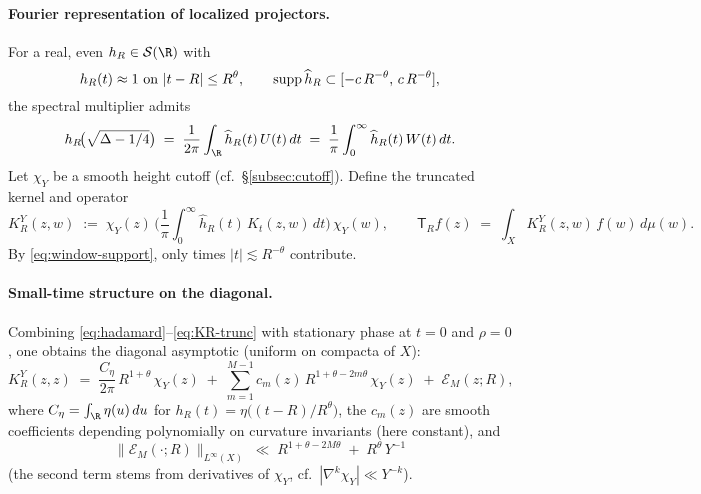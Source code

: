 \paragraph{Fourier representation of localized projectors.}
For a real, even $h_R\in \mathcal{S}(\R)$ with
\begin{equation}\label{eq:window-support}
  h_R(t)\approx 1 \ \text{on}\ |t-R|\le R^\theta, 
  \qquad \operatorname{supp} \widehat{h}_R \subset [-c\,R^{-\theta},\,c\,R^{-\theta}],
\end{equation}
the spectral multiplier admits
\begin{equation}\label{eq:hR-functional}
  h_R\!\big(\sqrt{\Delta-1/4}\big)
  \;=\; \frac{1}{2\pi}\int_{\R} \widehat{h}_R(t)\,U(t)\,dt 
  \;=\; \frac{1}{\pi}\int_{0}^{\infty} \widehat{h}_R(t)\,W(t)\,dt.
\end{equation}
Let $\chi_Y$ be a smooth height cutoff (cf.\ \S\ref{subsec:cutoff}).
Define the truncated kernel and operator
\begin{equation}\label{eq:KR-trunc}
  K_R^Y(z,w) \;:=\; \chi_Y(z)\,\Big(\frac{1}{\pi}\int_0^\infty \widehat{h}_R(t)\,K_t(z,w)\,dt\Big)\,\chi_Y(w),
  \qquad 
  \mathsf{T}_R f(z)\;=\;\int_X K_R^Y(z,w)\,f(w)\,d\mu(w).
\end{equation}
By \eqref{eq:window-support}, only times $|t|\lesssim R^{-\theta}$ contribute.

\paragraph{Small-time structure on the diagonal.}
Combining \eqref{eq:hadamard}–\eqref{eq:KR-trunc} with stationary phase at $t=0$ and $\rho=0$,
one obtains the diagonal asymptotic (uniform on compacta of $X$):
\begin{equation}\label{eq:diag-asymp}
  K_R^Y(z,z)
  \;=\; \frac{C_\eta}{2\pi}\,R^{1+\theta}\,\chi_Y(z) 
  \;+\; \sum_{m=1}^{M-1} c_m(z)\,R^{1+\theta-2m\theta}\,\chi_Y(z)
  \;+\; \mathcal{E}_M(z;R),
\end{equation}
where $C_\eta=\int_{\R}\eta(u)\,du$ for $h_R(t)=\eta\!\big((t-R)/R^\theta\big)$,
the $c_m(z)$ are smooth coefficients depending polynomially on curvature invariants
(here constant), and
\begin{equation}\label{eq:diag-error}
  \|\mathcal{E}_M(\cdot;R)\|_{L^\infty(X)} 
  \;\ll\; R^{1+\theta-2M\theta} \;+\; R^{\theta}\,Y^{-1}
\end{equation}
(the second term stems from derivatives of $\chi_Y$, cf.\ $|\nabla^k \chi_Y|\ll Y^{-k}$).

